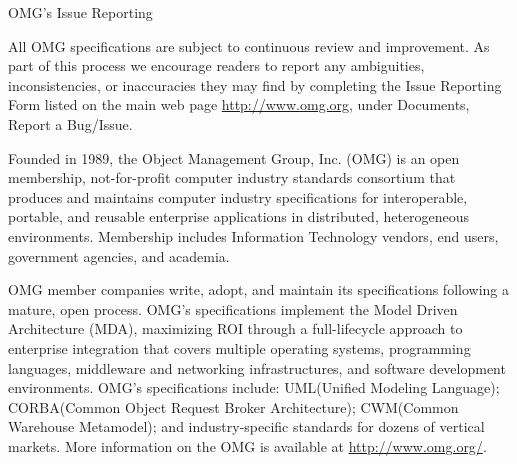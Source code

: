 \documentclass[10pt, a4paper]{isov2}
\newcommand{\OMGparagraph}[1]{
\vspace{23pt}
{\centerline {#1}}
\vspace{3pt}
}
\begin{document}
\newpage 
\OMGparagraph{OMG's Issue Reporting }
All OMG specifications are subject to continuous review and improvement. As part of this process we encourage readers to report any ambiguities, inconsistencies, or inaccuracies they may find by completing the Issue Reporting Form listed on the main web page \url{http://www.omg.org}, under Documents, Report a Bug/Issue. %


\cleardoublepage


\renewcommand{\contentsname}{Table of Contents}
\tableofcontents


\cleardoublepage
{}




Founded in 1989, the Object Management Group, Inc. (OMG) is an open membership, not-for-profit 
computer industry standards consortium that produces and maintains computer industry specifications 
for interoperable, portable, and reusable enterprise applications in distributed, heterogeneous 
environments. Membership includes Information Technology vendors, end users, government agencies, 
 and academia. 
 
OMG member companies write, adopt, and maintain its specifications following a mature, open 
 process. OMG's specifications implement the Model Driven Architecture\textregistered \xspace 
 (MDA\textregistered\xspace), maximizing ROI 
  through a full-lifecycle approach to enterprise integration that covers multiple operating 
   systems, programming languages, middleware and networking infrastructures, and software 
    development environments. OMG's specifications include: UML\textregistered\xspace (Unified Modeling Language\texttrademark\xspace); 
	 CORBA\textregistered\xspace (Common Object Request Broker Architecture); CWM\texttrademark\xspace (Common Warehouse Metamodel); and 
	  industry-specific standards for dozens of vertical markets. 
More information on the OMG is available at \url{http://www.omg.org/}.
\end{document}
